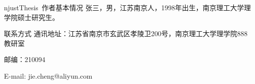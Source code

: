
\begin{resume}

\begin{resumesection}{njustThesis~作者基本情况}
张三，男，江苏南京人，1998年出生，南京理工大学理学院硕士研究生。
\end{resumesection}

\begin{resumelist}{联系方式}
通讯地址：江苏省南京市玄武区孝陵卫200号，南京理工大学理学院888教研室

邮编：210094

E-mail: jie.cheng@aliyun.com
\end{resumelist}

\end{resume}
